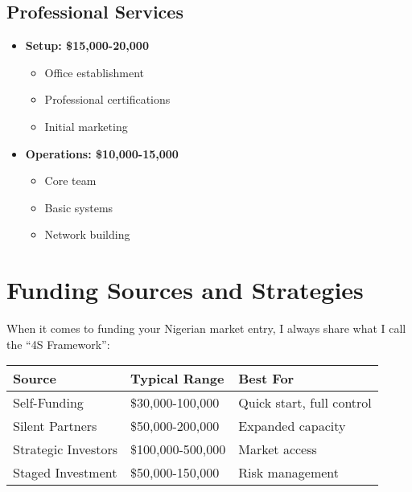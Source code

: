 \subsection{Professional Services}\label{subsec:professional-services}
\begin{tcolorbox}[colback=white,colframe=primary,title=\textbf{Services Sector Financial Focus}]
\begin{itemize}
    \item \textbf{Setup: \$15,000-20,000}
    \begin{itemize}
        \item Office establishment
        \item Professional certifications
        \item Initial marketing
    \end{itemize}

    \item \textbf{Operations: \$10,000-15,000}
    \begin{itemize}
        \item Core team
        \item Basic systems
        \item Network building
    \end{itemize}
\end{itemize}
\end{tcolorbox}

\section{Funding Sources and Strategies}\label{sec:funding-sources}

When it comes to funding your Nigerian market entry, I always share what I call the ``4S Framework'':

\begin{center}
\begin{tabularx}{\textwidth}{>{\raggedright\arraybackslash}X >{\centering\arraybackslash}X >{\raggedright\arraybackslash}X}
    \toprule
    \textbf{Source} & \textbf{Typical Range} & \textbf{Best For} \\
    \midrule
    Self-Funding & \$30,000-100,000 & Quick start, full control \\
    Silent Partners & \$50,000-200,000 & Expanded capacity \\
    Strategic Investors & \$100,000-500,000 & Market access \\
    Staged Investment & \$50,000-150,000 & Risk management \\
    \bottomrule
\end{tabularx}
\end{center}

